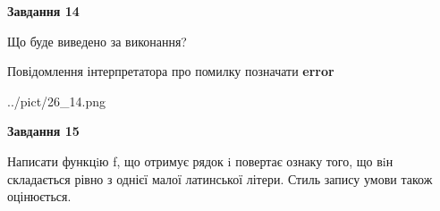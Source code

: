 \documentclass[11pt, ukrainian]{article}
\begin{document}
{\begin {large}
{\begin {center}\textbf{Завдання 14}\end {center}}\par
Що буде виведено за виконання? \par
Повідомлення інтерпретатора про помилку позначати \textbf{error}

\begin{center}
	{../pict/26_14.png}
\end{center}
\newpage

{\begin {center}\textbf{Завдання 15}\end {center}}\par

Написати функцiю f, що отримує рядок i повертає ознаку того, що вiн складається рівно з однієї малої латинської літери. Стиль запису умови також оцінюється.\par
\newpage

\end {large}}
\end{document}
